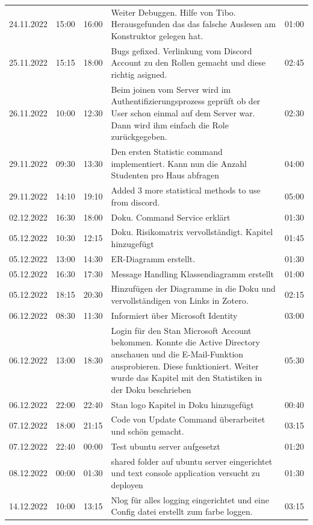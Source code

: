 \documentclass[a4paper, table]{article}
\begin{document}
\begin{longtable}[h]{|l|l|l|p{20em}|l|}
    24.11.2022 & 15:00 & 16:00 & Weiter Debuggen. Hilfe von Tibo. Herausgefunden   das das falsche Auslesen am Konstruktor gelegen hat. & 01:00 \\
    25.11.2022 & 15:15 & 18:00 & Bugs gefixed. Verlinkung vom Discord Account zu   den Rollen gemacht und diese richtig asigned. & 02:45 \\
    26.11.2022 & 10:00 & 12:30 & Beim joinen vom Server wird im   Authentifizierungsprozess geprüft ob der User schon einmal auf dem Server   war. Dann wird ihm   einfach die Role zurückgegeben. & 02:30  \\
    29.11.2022 & 09:30 & 13:30 & Den ersten Statistic command implementiert. Kann   nun die Anzahl Studenten pro Haus abfragen & 04:00  \\
    29.11.2022 & 14:10 & 19:10 & Added 3 more statistical   methods to use from discord. & 05:00  \\
    02.12.2022 & 16:30 & 18:00 & Doku. Command Service   erklärt & 01:30 \\
    05.12.2022 & 10:30 & 12:15 & Doku. Risikomatrix vervollständigt. Kapitel   hinzugefügt & 01:45  \\
    05.12.2022 & 13:00 & 14:30 & ER-Diagramm erstellt. & 01:30  \\
    05.12.2022 & 16:30 & 17:30 & Message Handling   Klassendiagramm erstellt & 01:00 \\
    05.12.2022 & 18:15 & 20:30 & Hinzufügen der Diagramme in die Doku und   vervollständigen von Links in Zotero. & 02:15  \\
    06.12.2022 & 08:30 & 11:30 & Informiert über Microsoft   Identity & 03:00  \\
    06.12.2022 & 13:00 & 18:30 & Login für den Stan Microsoft Account bekommen.   Konnte die Active Directory anschauen und die E-Mail-Funktion ausprobieren.   Diese funktioniert. Weiter wurde das Kapitel mit den Statistiken in der Doku   beschrieben & 05:30  \\
    06.12.2022 & 22:00 & 22:40 & Stan logo Kapitel in Doku hinzugefügt & 00:40 \\
    07.12.2022 & 18:00 & 21:15 & Code von Update Command überarbeitet und schön   gemacht. & 03:15\\
    07.12.2022 & 22:40 & 00:00 & Test ubuntu server   aufgesetzt & 01:20  \\
    08.12.2022 & 00:00 & 01:30 & shared folder auf ubuntu server eingerichtet und   text console application versucht zu deployen & 01:30 \\
    14.12.2022 & 10:00 & 13:15 & Nlog für alles logging eingerichtet und eine   Config datei erstellt zum farbe loggen. & 03:15 \\

\end{longtable}
\end{document}
